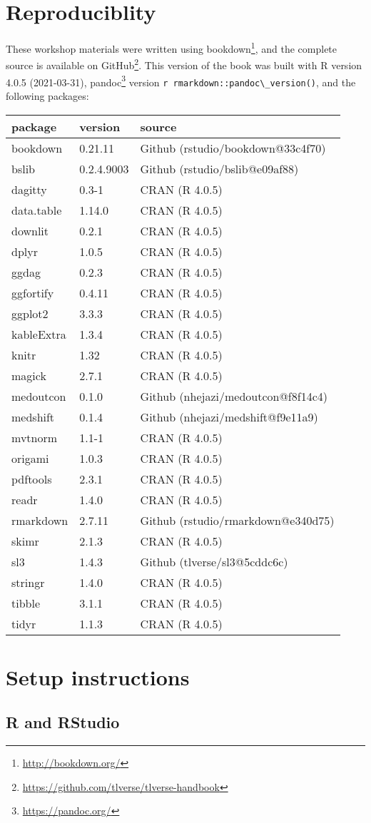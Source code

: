 \documentclass[
  12pt,
]{book}
\newcommand{\passthrough}[1]{#1}
\renewcommand{\href}[2]{#2\footnote{\url{#1}}}
\theoremstyle{definition}
\theoremstyle{definition}
\theoremstyle{definition}
\newcommand{\1}{\mathbbm{1}}
\begin{document}
\hypertarget{repro}{%
\section{Reproduciblity}\label{repro}}

These workshop materials were written using \href{http://bookdown.org/}{bookdown},
and the complete source is available on
\href{https://github.com/tlverse/tlverse-handbook}{GitHub}. This version of the book
was built with R version 4.0.5 (2021-03-31), \href{https://pandoc.org/}{pandoc} version \passthrough{\lstinline!r rmarkdown::pandoc\_version()!}, and the following packages:

\begin{longtable}[]{@{}lll@{}}
\toprule
package & version & source\tabularnewline
\midrule
\endhead
bookdown & 0.21.11 & Github (rstudio/bookdown@33c4f70)\tabularnewline
bslib & 0.2.4.9003 & Github (rstudio/bslib@e09af88)\tabularnewline
dagitty & 0.3-1 & CRAN (R 4.0.5)\tabularnewline
data.table & 1.14.0 & CRAN (R 4.0.5)\tabularnewline
downlit & 0.2.1 & CRAN (R 4.0.5)\tabularnewline
dplyr & 1.0.5 & CRAN (R 4.0.5)\tabularnewline
ggdag & 0.2.3 & CRAN (R 4.0.5)\tabularnewline
ggfortify & 0.4.11 & CRAN (R 4.0.5)\tabularnewline
ggplot2 & 3.3.3 & CRAN (R 4.0.5)\tabularnewline
kableExtra & 1.3.4 & CRAN (R 4.0.5)\tabularnewline
knitr & 1.32 & CRAN (R 4.0.5)\tabularnewline
magick & 2.7.1 & CRAN (R 4.0.5)\tabularnewline
medoutcon & 0.1.0 & Github (nhejazi/medoutcon@f8f14c4)\tabularnewline
medshift & 0.1.4 & Github (nhejazi/medshift@f9e11a9)\tabularnewline
mvtnorm & 1.1-1 & CRAN (R 4.0.5)\tabularnewline
origami & 1.0.3 & CRAN (R 4.0.5)\tabularnewline
pdftools & 2.3.1 & CRAN (R 4.0.5)\tabularnewline
readr & 1.4.0 & CRAN (R 4.0.5)\tabularnewline
rmarkdown & 2.7.11 & Github (rstudio/rmarkdown@e340d75)\tabularnewline
skimr & 2.1.3 & CRAN (R 4.0.5)\tabularnewline
sl3 & 1.4.3 & Github (tlverse/sl3@5cddc6c)\tabularnewline
stringr & 1.4.0 & CRAN (R 4.0.5)\tabularnewline
tibble & 3.1.1 & CRAN (R 4.0.5)\tabularnewline
tidyr & 1.1.3 & CRAN (R 4.0.5)\tabularnewline
\bottomrule
\end{longtable}

\hypertarget{setup}{%
\section{Setup instructions}\label{setup}}

\hypertarget{r-and-rstudio}{%
\subsection{R and RStudio}\label{r-and-rstudio}}
\end{document}
